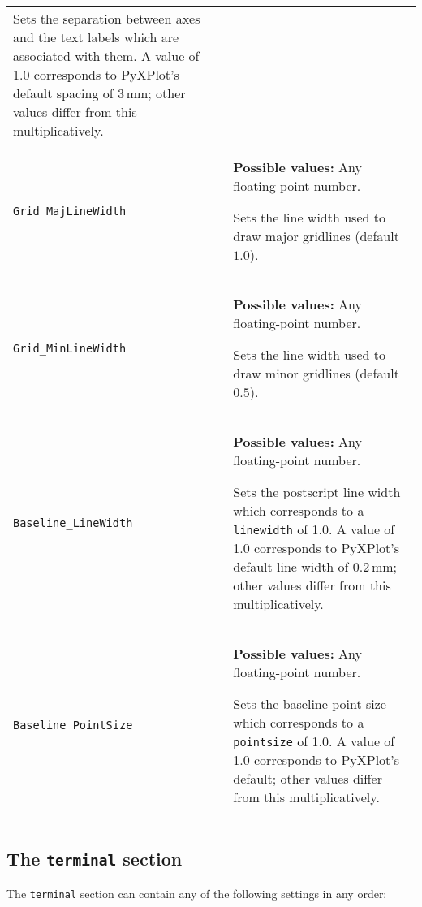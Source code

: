 \begin{longtable}{p{3.4cm}p{9cm}}
               Sets the separation between axes and the text labels which are associated with them. A value of 1.0 corresponds to PyXPlot's default spacing of $3\,\mathrm{mm}$; other values differ from this multiplicatively.
               \\
{\tt Grid\_MajLineWidth} & {\bf Possible values:} Any floating-point number.

               Sets the line width used to draw major gridlines (default $1.0$).
               \\
{\tt Grid\_MinLineWidth} & {\bf Possible values:} Any floating-point number.

               Sets the line width used to draw minor gridlines (default $0.5$).
               \\
{\tt Baseline\_LineWidth} & {\bf Possible values:} Any floating-point number.

               Sets the postscript line width which corresponds to a {\tt linewidth} of 1.0. A value of 1.0 corresponds to PyXPlot's default line width of $0.2\,\mathrm{mm}$; other values differ from this multiplicatively.
               \\
{\tt Baseline\_PointSize} & {\bf Possible values:} Any floating-point number.

               Sets the baseline point size which corresponds to a {\tt pointsize} of 1.0. A value of 1.0 corresponds to PyXPlot's default; other values differ from this multiplicatively.
               \\
\end{longtable}

\subsection{The {\tt terminal} section}
\label{sec:configfile_terminal}

The {\tt terminal} section can contain any of the following settings in any order:

